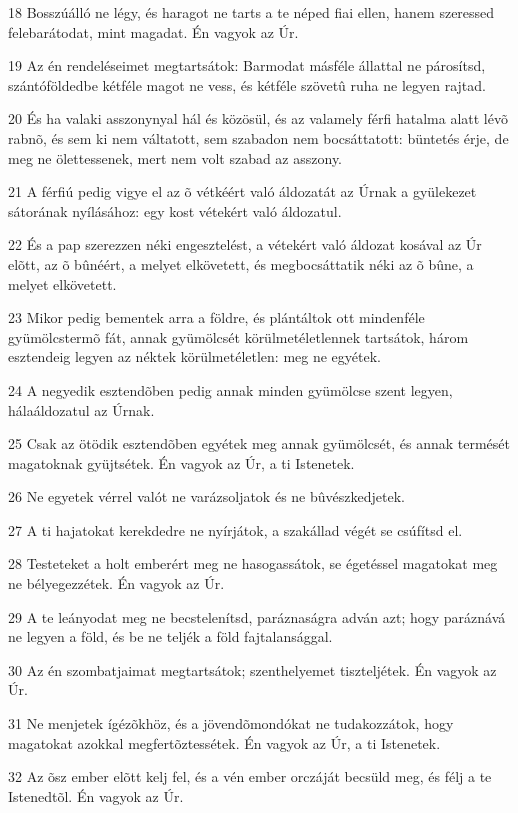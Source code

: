 \par 18 Bosszúálló ne légy, és haragot ne tarts a te néped fiai ellen, hanem szeressed  felebarátodat, mint magadat. Én vagyok az Úr.
\par 19 Az én rendeléseimet megtartsátok: Barmodat másféle állattal ne párosítsd, szántóföldedbe kétféle magot ne vess, és kétféle szövetû ruha ne legyen rajtad.
\par 20 És ha valaki asszonynyal hál és közösül, és az valamely férfi hatalma alatt lévõ rabnõ, és sem ki nem váltatott, sem szabadon nem bocsáttatott: büntetés érje, de meg ne ölettessenek, mert nem volt szabad az asszony.
\par 21 A férfiú pedig vigye el az õ vétkéért való áldozatát az Úrnak a gyülekezet sátorának nyílásához: egy kost vétekért való áldozatul.
\par 22 És a pap szerezzen néki engesztelést, a vétekért való áldozat kosával az Úr elõtt, az õ bûnéért, a melyet elkövetett, és megbocsáttatik néki az õ bûne, a melyet elkövetett.
\par 23 Mikor pedig bementek arra a földre, és plántáltok ott mindenféle gyümölcstermõ fát, annak gyümölcsét körülmetéletlennek tartsátok, három esztendeig legyen az néktek körülmetéletlen: meg ne egyétek.
\par 24 A negyedik esztendõben pedig annak minden gyümölcse szent legyen, hálaáldozatul az Úrnak.
\par 25 Csak az ötödik esztendõben egyétek meg annak gyümölcsét, és annak termését magatoknak gyüjtsétek. Én vagyok az Úr, a ti Istenetek.
\par 26 Ne egyetek vérrel valót ne varázsoljatok és ne  bûvészkedjetek.
\par 27 A ti hajatokat kerekdedre ne nyírjátok, a szakállad végét se csúfítsd el.
\par 28 Testeteket a holt emberért meg ne hasogassátok, se égetéssel magatokat meg ne bélyegezzétek. Én vagyok az Úr.
\par 29 A te leányodat meg ne becstelenítsd, paráznaságra adván azt; hogy paráznává ne legyen a föld, és be ne teljék a föld fajtalansággal.
\par 30 Az én szombatjaimat megtartsátok; szenthelyemet tiszteljétek. Én vagyok az Úr.
\par 31 Ne menjetek ígézõkhöz, és a jövendõmondókat ne tudakozzátok, hogy magatokat azokkal megfertõztessétek. Én vagyok az Úr, a ti Istenetek.
\par 32 Az õsz ember elõtt kelj fel, és a vén ember orczáját becsüld meg, és félj a te Istenedtõl. Én vagyok az Úr.
